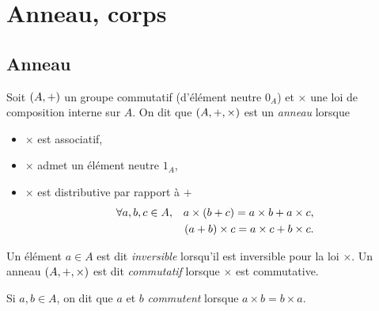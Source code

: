 \documentclass{magnolia}
\begin{document}
\magtoc


\section{Anneau, corps}
\subsection{Anneau}

\begin{definition}
Soit $\left(A,+\right)$ un groupe commutatif (d'élément neutre $0_A$) et $\times$ une
loi de composition interne sur $A$. On dit que $\left(A,+,\times\right)$ est un \emph{anneau}
lorsque
\begin{itemize}
\item $\times$ est associatif,
\item $\times$ admet un élément neutre $1_A$,
\item $\times$ est distributive par rapport à $+$
  \begin{eqnarray*}
  \forall a,b,c\in A, & & a\times\left(b+c\right)=a\times b+a\times c,\\    
                     & & \left(a+b\right)\times c=a\times c+b\times c.
  \end{eqnarray*}
\end{itemize}
Un élément $a\in A$ est dit \emph{inversible} lorsqu'il est inversible pour la loi
$\times$. Un anneau $\left(A,+,\times\right)$ est dit \emph{commutatif} lorsque $\times$ est
commutative.
\end{definition}

\begin{remarqueUnique}
\remarque Si $a,b\in A$, on dit que $a$ et $b$ \emph{commutent} lorsque $a\times b=b\times a$.
\end{remarqueUnique}
\end{document}
